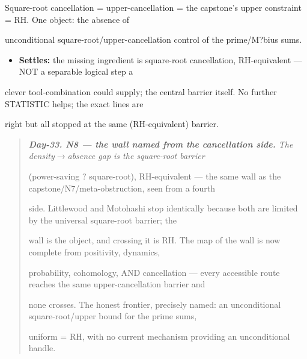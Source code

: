 \documentclass[10pt]{article}
\begin{document}
  Square-root cancellation = upper-cancellation = the capstone's upper constraint = RH. One object: the absence of\par
  unconditional square-root/upper-cancellation control of the prime/M?bius sums.\par
\begin{itemize}
\item \textbf{Settles:} the missing ingredient is square-root cancellation, RH-equivalent --- NOT a separable logical step a
\end{itemize}
  clever tool-combination could supply; the central barrier itself. No further STATISTIC helps; the exact lines are\par
  right but all stopped at the same (RH-equivalent) barrier.\par

\begin{quote}\itshape
\textbf{Day-33. N8 --- the wall named from the cancellation side.} The density\ensuremath{\to}absence gap is the square-root barrier\par
(power-saving ? square-root), RH-equivalent --- the same wall as the capstone/N7/meta-obstruction, seen from a fourth\par
side. Littlewood and Motohashi stop identically because both are limited by the universal square-root barrier; the\par
wall is the object, and crossing it is RH. The map of the wall is now complete from positivity, dynamics,\par
probability, cohomology, AND cancellation --- every accessible route reaches the same upper-cancellation barrier and\par
none crosses. The honest frontier, precisely named: an unconditional square-root/upper bound for the prime sums,\par
uniform = RH, with no current mechanism providing an unconditional handle.\par
\end{quote}
\end{document}
